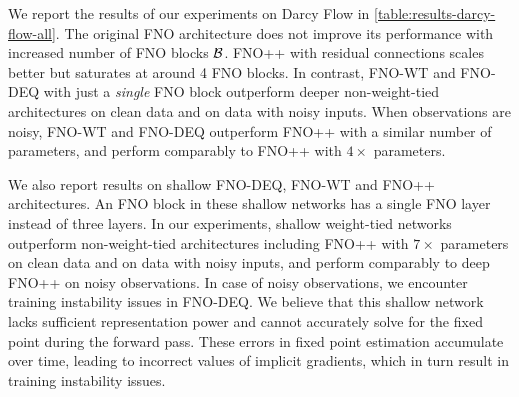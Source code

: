 We report the results of our experiments on Darcy Flow in \cref{table:results-darcy-flow-all}. 
The original FNO architecture does not improve its performance  with increased number of FNO blocks ${\mathcal{B}}$.
FNO++ with residual connections scales better but saturates at around 4 FNO blocks. In contrast, FNO-WT and FNO-DEQ with just a \emph{single} FNO block outperform deeper non-weight-tied architectures on clean data and on data with noisy inputs. 
When  observations are noisy, FNO-WT and FNO-DEQ outperform FNO++ with a similar number of parameters, and perform comparably to FNO++ with $4\times$ parameters. 

We also report results on shallow FNO-DEQ, FNO-WT and FNO++ architectures. An FNO block in these shallow networks has a single FNO layer instead of three layers. In our experiments, shallow weight-tied networks outperform non-weight-tied architectures including FNO++ with $7\times$ parameters on clean data and on data with noisy inputs, and  perform comparably to deep FNO++ on noisy observations. In case of noisy observations, we encounter training instability issues in FNO-DEQ. We believe that this shallow network lacks sufficient representation power and cannot accurately solve for the fixed point during the forward pass. These errors in fixed point estimation accumulate over time, leading to incorrect values of implicit gradients, which in turn result in training instability issues.
